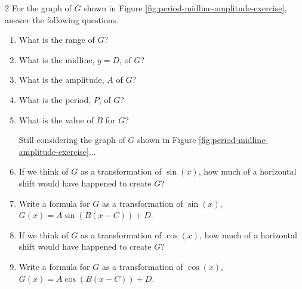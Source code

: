 \begin{myPractice}
	\begin{multicols}{2}
		For the graph of $G$ shown in Figure \ref{fig:period-midline-amplitude-exercise}, answer the following questions.
		\begin{center}\captionsetup{type=figure}
			\label{fig:period-midline-amplitude-exercise}
		\end{center}
		\columnbreak
		\begin{enumerate}
			\item What is the range of $G$?
			\vfill
			\item What is the midline, $y=D$, of $G$?
			\vfill
			\item What is the amplitude, $A$ of $G$?
			\vfill
			\item What is the period, $P$, of $G$?
			\vfill
			\item What is the value of $B$ for $G$?
			\vfill

\newpage

		Still considering the graph of $G$ shown in Figure \ref{fig:period-midline-amplitude-exercise}...
			\vspace{0.5cm}
			\item If we think of $G$ as a transformation of $\sin(x)$, how much of a horizontal shift would have happened to create $G$?
			\vspace{1cm}
			\item Write a formula for $G$ as a transformation of $\sin(x)$, $G(x)=A\sin(B(x-C))+D$.
			\vspace{1cm}
			\item If we think of $G$ as a transformation of $\cos(x)$, how much of a horizontal shift would have happened to create $G$?
			\vspace{1cm}
			\item Write a formula for $G$ as a transformation of $\cos(x)$, $G(x)=A\cos(B(x-C))+D$.
			\vspace{1cm}
		\end{enumerate}
	\end{multicols}
\end{myPractice}
\vfill

